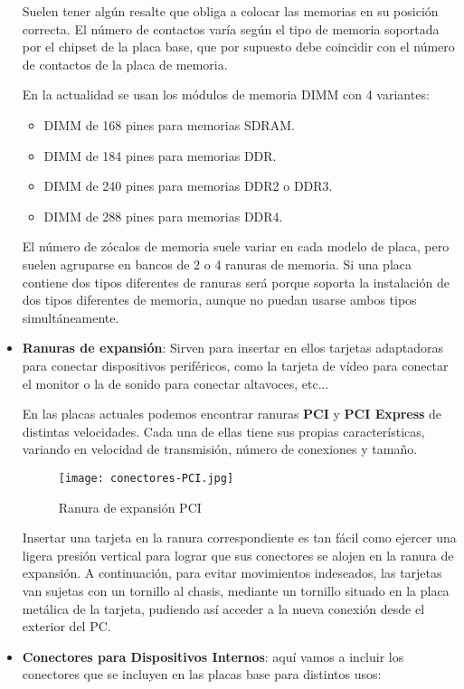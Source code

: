 \begin{itemize}
    Suelen tener algún resalte que obliga a colocar las memorias en su posición correcta. El número de contactos varía según el tipo de memoria soportada por el chipset de la placa base, que por supuesto debe coincidir con el número de contactos de la placa de memoria.

    En la actualidad se usan los módulos de memoria DIMM con 4 variantes:
    \begin{itemize}
        \item DIMM de 168 pines para memorias SDRAM.
        \item DIMM de 184 pines para memorias DDR.
        \item DIMM de 240 pines para memorias DDR2 o DDR3.
        \item DIMM de 288 pines para memorias DDR4.
    \end{itemize}

    El número de zócalos de memoria suele variar en cada modelo de placa, pero suelen agruparse en bancos de 2 o 4 ranuras de memoria. Si una placa contiene dos tipos diferentes de ranuras será porque soporta la instalación de dos tipos diferentes de memoria, aunque no puedan usarse ambos tipos simultáneamente.

    \item \textbf{Ranuras de expansión}: Sirven para insertar en ellos tarjetas adaptadoras para conectar dispositivos periféricos, como la tarjeta de vídeo para conectar el monitor o la de sonido para conectar altavoces, etc...

    En las placas actuales podemos encontrar ranuras \textbf{PCI} y \textbf{PCI Express} de distintas velocidades. Cada una de ellas tiene sus propias características, variando en velocidad de transmisión, número de conexiones y tamaño.

        \begin{figure}[ht]
        \centering
        \texttt{[image: conectores-PCI.jpg]}
        \caption{Ranura de expansión PCI}
    \end{figure}

    Insertar una tarjeta en la ranura correspondiente es tan fácil como ejercer una ligera presión vertical para lograr que sus conectores se alojen en la ranura de expansión. A continuación, para evitar movimientos indeseados, las tarjetas van sujetas con un tornillo al chasis, mediante un tornillo situado en la placa metálica de la tarjeta, pudiendo así acceder a la nueva conexión desde el exterior del PC.

    \item \textbf{Conectores para Dispositivos Internos}: aquí vamos a incluir los conectores que se incluyen en las placas base para distintos usos:


\end{itemize}

